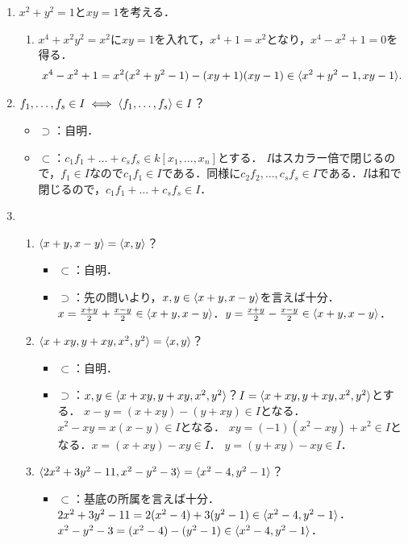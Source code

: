 \documentclass[9pt]{ltjsarticle}
\theoremstyle{break}
\theoremstyle{break}
\theoremstyle{break}
\theoremstyle{break}
\theoremstyle{break}
\theoremstyle{break}
\theoremstyle{break}
\theoremstyle{break}
\theoremstyle{break}
\theoremstyle{break}
\theoremstyle{break}
\theoremstyle{break}
\theoremstyle{break}
\theoremstyle{break}
\theoremstyle{break}
\theoremstyle{nonumberbreak}
\theoremstyle{nonumberbreak}
\begin{document}
\begin{enumerate}[label=(問題\arabic*)]
 \item $x^2+y^2=1$と$xy=1$を考える．
\begin{enumerate}[label=(\alph*)]
 \item $x^4+x^2y^2=x^2$に$xy=1$を入れて，$x^4+1=x^2$となり，$x^4-x^2+1=0$を得る．
\begin{align}
 x^4-x^2+1
=
x^2(x^2+y^2-1) - (xy+1)(xy-1) \in \langle x^2+y^2-1,xy-1 \rangle.
\end{align}
\end{enumerate}
 \item $f_1,\dots,f_s \in I \iff \langle f_1,\dots,f_s \rangle\in I$？
\begin{itemize}
 \item $\supset$：自明．
 \item $\subset$：$c_1 f_1 + \dots + c_s f_s \in k[x_1,\dots,x_n]$とする．
$I$はスカラー倍で閉じるので，$f_1\in I$なので$c_1 f_1 \in I$である．同様に$c_2 f_2,\dots,c_s f_s \in I$である．$I$は和で閉じるので，$c_1 f_1 + \dots + c_s f_s \in I$．
\end{itemize}
 \item
\begin{enumerate}[label=(\alph*)]
 \item $\langle x+y,x-y \rangle = \langle x,y \rangle$？
\begin{itemize}
 \item $\subset$：自明．
 \item $\supset$：先の問いより，$x,y\in \langle x+y,x-y \rangle$を言えば十分．$x = \frac{x+y}{2} + \frac{x-y}{2}  \in \langle x+y,x-y \rangle$．$y=\frac{x+y}{2}-\frac{x-y}{2} \in \langle x+y,x-y \rangle$．
\end{itemize}
 \item $\langle x+xy,y+xy,x^2,y^2 \rangle=\langle x,y \rangle$？
\begin{itemize}
 \item $\subset$：自明．
 \item $\supset$：$x,y \in \langle x+xy,y+xy,x^2,y^2 \rangle$？$I=\langle x+xy,y+xy,x^2,y^2 \rangle$とする．
$x-y =(x+xy)-(y+xy) \in I$となる．$x^2 - xy = x(x-y)\in I$となる．
$xy = (-1)(x^2-xy) + x^2 \in I$となる．$x = (x+xy)-xy \in I$．
$y = (y+xy)-xy \in I$．
\end{itemize}
 \item $\langle 2x^2+3y^2-11,x^2-y^2-3 \rangle=\langle x^2-4,y^2-1 \rangle$？
\begin{itemize}
 \item $\subset$：基底の所属を言えば十分．$2x^2+3y^2-11 = 2(x^2-4) + 3(y^2-1) \in \langle x^2-4,y^2-1 \rangle$．
$x^2-y^2-3 = (x^2-4) - (y^2-1) \in \langle x^2-4,y^2-1 \rangle$．

\end{itemize}
\end{enumerate}
\end{enumerate}
\end{document}
